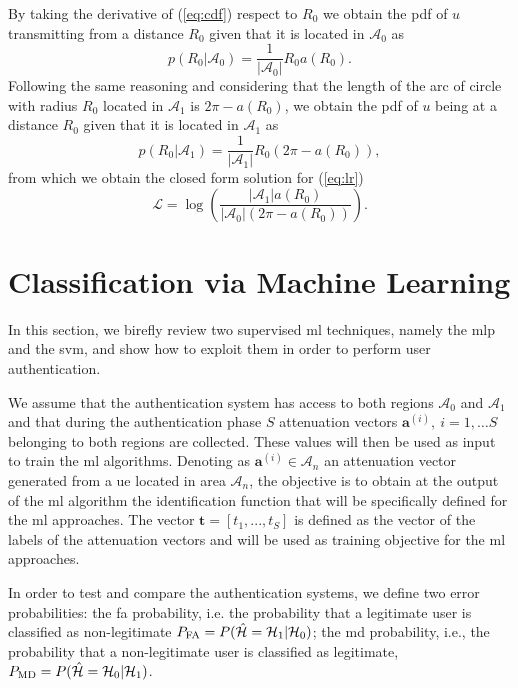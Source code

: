 \documentclass[twocolumns]{IEEEtran}
\begin{document}
By taking the derivative of (\ref{eq:cdf}) respect to $R_0$ we obtain the \ac{pdf} of $u$ transmitting from a distance $R_0$ given that it is located in $\mathcal{A}_0$ as
\begin{equation}
    p(R_0|\mathcal{A}_0) = \frac{1}{|\mathcal{A}_0|}R_0a(R_0).
\end{equation}
Following the same reasoning and considering that the length of the arc of circle with radius $R_0$ located in $\mathcal{A}_1$ is $2\pi - a(R_0)$, we obtain the \ac{pdf} of $u$ being at a distance $R_0$ given that it is located in $\mathcal{A}_1$ as
\begin{equation}
     p(R_0|\mathcal{A}_1) = \frac{1}{|\mathcal{A}_1|}R_0\left(2\pi-a(R_0)\right),
\end{equation}
from which we obtain the closed form solution for (\ref{eq:lr}) 
\begin{equation}
    \mathcal{L}=\log\left(\frac{|\mathcal{A}_1|a(R_0)}{|\mathcal{A}_0|\left(2\pi-a(R_0)\right)}\right).
\end{equation}

\section{Classification via Machine Learning}\label{sec: ml}
In this section, we birefly review two supervised \ac{ml} techniques, namely the \ac{mlp} and the \ac{svm}, and show how to exploit them in order to perform user authentication.

We assume that the authentication system has access to both regions $\mathcal{A}_0$ and $\mathcal{A}_1$ and that during the authentication phase $S$ attenuation vectors $\bm{a}^{(i)}, \ i=1,\dots S$  belonging to both regions are collected. These values will then be used as input to train the \ac{ml} algorithms. Denoting as $\bm{a}^{(i)}\in \mathcal{A}_n$ an attenuation vector generated from a \ac{ue} located in area $\mathcal{A}_{n}$, the objective is to obtain at the output of the \ac{ml} algorithm the identification function that will be specifically defined for the \ac{ml} approaches. The vector $\bm{t}=[t_1,...,t_S]$ is defined as the vector of the labels of the attenuation vectors and will be used as training objective for the \ac{ml} approaches.

In order to test and compare the authentication systems, we define two error probabilities: the \ac{fa} probability, i.e. the probability  that a legitimate user is classified as non-legitimate $P_{\rm FA} =P(\hat{\mathcal H} = \mathcal H_1 | \mathcal H_0)$; the \ac{md} probability, i.e., the probability that a non-legitimate user is classified as legitimate, $P_{\rm MD}=P(\hat{\mathcal H} = \mathcal H_0 | \mathcal H_1)$.
\end{document}
